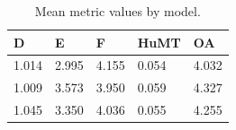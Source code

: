 \begin{table}[t]
\centering
\caption{Mean metric values by model.}
\label{tab:model_means}
\begin{tabular}{lllll}
\toprule
D & E & F & HuMT & OA \\
\midrule
1.014 & 2.995 & 4.155 & 0.054 & 4.032 \\
1.009 & 3.573 & 3.950 & 0.059 & 4.327 \\
1.045 & 3.350 & 4.036 & 0.055 & 4.255 \\
\bottomrule
\end{tabular}
\end{table}
